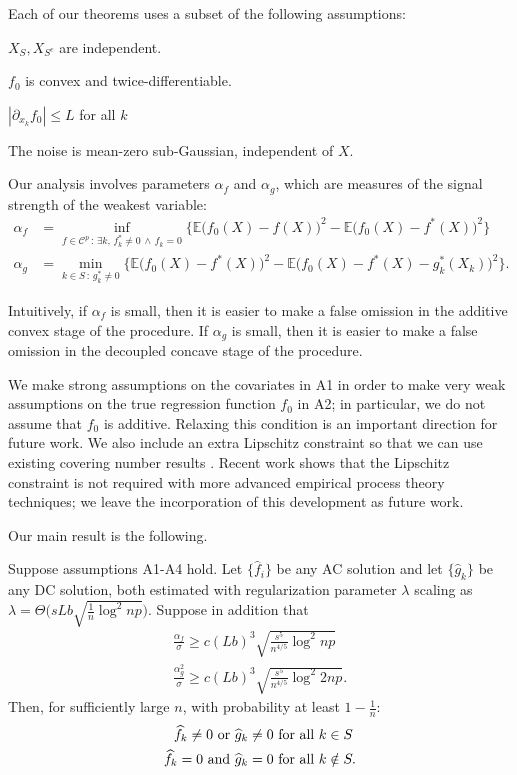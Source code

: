 Each of our theorems uses a subset of the following assumptions:
\begin{packed_enum}
\item[A1:] $X_S, X_{S^c}$ are independent. 
\item[A2:] $f_0$ is convex and twice-differentiable. 
\item[A3:] $|\partial_{x_k} f_0 | \leq L$ for all $k$
\item[A4:] The noise is mean-zero sub-Gaussian, independent of $X$.
\end{packed_enum}

Our analysis involves parameters $\alpha_f$ and $\alpha_g$,
which are measures of the signal strength of the weakest variable:
\begin{align*}
\alpha_f &= \inf_{f \in \mathcal{C}^p \,:\, \exists k ,\, f^*_k \neq 0 \,\wedge\, f_k = 0} 
       \Big\{ \mathbb{E} \big( f_0(X) - f(X) \big)^2 - 
        \mathbb{E} \big( f_0(X) - f^*(X) \big)^2  \Big\}\\
\alpha_g &=   \min_{k \in S \,:\, g^*_k \neq 0}
      \Big\{ \mathbb{E} \big( f_0(X) - f^*(X) \big)^2 - 
    \mathbb{E} \big( f_0(X) - f^*(X) - g^*_k(X_k) \big)^2 \Big\}.
\end{align*}

Intuitively, if $\alpha_f$ is small, then it is easier to make a
false omission in the additive convex stage of the procedure. If
$\alpha_g$ is small, then it is easier to make a false omission in
the decoupled concave stage of the procedure.

We make strong assumptions on the covariates in A1 in order to make
very weak assumptions on the true regression function $f_0$ in
A2; in particular, we do not assume that $f_0$ is additive. 
Relaxing this condition is an important direction for future work.
We also include an extra
Lipschitz constraint so that we can use existing covering number
results \citep{Bronshtein:76}. Recent work
\cite{Guntu:13} shows that the Lipschitz constraint
is not required with more advanced empirical process theory
techniques; we leave the incorporation of this development as future work. 

Our main result is the following.
\begin{stheorem}
Suppose assumptions A1-A4 hold. Let $\{\hat{f}_i\}$ be any AC solution and
let $\{\hat{g}_k\}$ be any DC solution, both estimated with 
regularization parameter $\lambda$ scaling as
$\lambda = \Theta \Big( sLb \sqrt{\frac{1}{n} \log^2 np} \Big)$. 
Suppose in addition that
\begin{gather}
\frac{\alpha_f}{\sigma} \geq c (Lb)^3 \sqrt{\frac{s^5}{n^{4/5}} \log^2
  np}\\
\frac{\alpha_g^2}{\sigma} \geq c (Lb)^3 \sqrt{\frac{s^5}{n^{4/5}}
  \log^2 2np}.
\end{gather}
Then, for sufficiently large $n$, with probability at least $1-\frac{1}{n}$:
\begin{align*}
\widehat{f}_k \neq 0 \textrm{ or } \widehat{g}_k \neq 0 &\textrm{ for all } k \in S\\
\widehat{f}_k = 0 \textrm{ and } \widehat{g}_k = 0 & \textrm{ for all } k \notin S.
\end{align*}

\end{stheorem}

